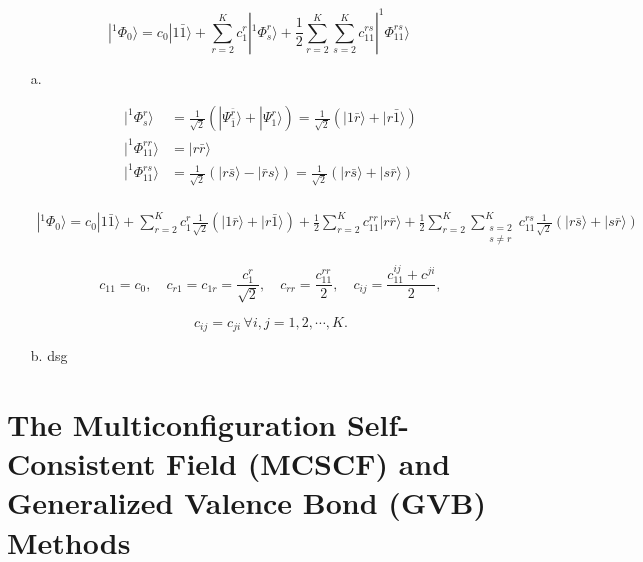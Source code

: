 \documentclass[a4paper]{book}
\begin{document}
	\begin{solution}
	
	\[
		| ^1 \Phi_0 \rangle = c_0 | 1 \bar{1} \rangle + \sum_{r=2}^K c^r_1 | ^1 \Phi^r_s \rangle + \frac{1}{2} \sum_{r=2}^K \sum_{s=2}^K c^{rs}_{11} | ^1 \Phi^{rs}_{11} \rangle 
	\]	
	
	\begin{enumerate}
	
	\item[a.] 
	
	\begin{align*}
		| ^1 \Phi^r_s \rangle &= \frac{ 1 }{ \sqrt{2} } \left( | \Psi^{ \bar{r} }_{ \bar{1} } \rangle + | \Psi^r_1 \rangle \right) = \frac{ 1 }{ \sqrt{2} } \left( | 1 \bar{r} \rangle + | r \bar{1} \rangle \right) \\
		| ^1 \Phi^{rr}_{11} \rangle &= | r \bar{r} \rangle \\
		| ^1 \Phi^{rs}_{11} \rangle &= \frac{ 1 }{ \sqrt{2} } \left( | r \bar{s} \rangle - | \bar{r} s \rangle \right) = \frac{ 1 }{ \sqrt{2} } \left( | r \bar{s} \rangle + | s \bar{r} \rangle \right) \\
	\end{align*}
	
	\begin{align*}
		| ^1 \Phi_0 \rangle = c_0 | 1 \bar{1} \rangle + \sum_{r=2}^K c^r_1 \frac{1}{ \sqrt{2} } \left( | 1 \bar{r} \rangle + | r \bar{1} \rangle \right) + \frac{1}{2} \sum_{r=2}^K c^{rr}_{11} | r \bar{r} \rangle + \frac{1}{2} \sum_{r=2}^K \sum_{ \substack{ s=2 \\ s \neq r } }^K c^{rs}_{11} \frac{ 1 }{ \sqrt{2} } \left( | r \bar{s} \rangle + | s \bar{r} \rangle \right)
	\end{align*}
	
	\begin{equation}
		c_{11} = c_0 , \quad c_{r1} = c_{1r} = \frac{ c^r_1 }{ \sqrt{2} }, \quad c_{rr} = \frac{ c^{rr}_{11} }{ 2 }, \quad c_{ij} = \frac{ c^{ij}_{11} + c^{ji} }{ 2 },
	\end{equation}
	
	\[
		c_{ij} = c_{ji} \, \forall i, j = 1,2,\cdots, K.
	\]
	
	\item[b.] dsg
		
	\end{enumerate}
	
	
	
	
	\end{solution}
	
	\section{The Multiconfiguration Self-Consistent Field (MCSCF) and \texorpdfstring{\\}- Generalized Valence Bond (GVB) Methods}
	
\end{document}

